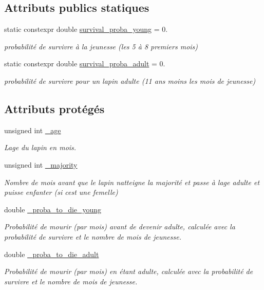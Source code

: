 \subsection*{Attributs publics statiques}
\begin{DoxyCompactItemize}
\item 
static constexpr double \hyperlink{classRabbit_ac6dc736f2b0395fa8692461a457a5297}{survival\+\_\+proba\+\_\+young} = 0.
\begin{DoxyCompactList}\small\item\em probabilité de survivre à la jeunesse (les 5 à 8 premiers mois) \end{DoxyCompactList}\item 
static constexpr double \hyperlink{classRabbit_a8b8affe7fcdc56e08da384d8d82ec556}{survival\+\_\+proba\+\_\+adult} = 0.
\begin{DoxyCompactList}\small\item\em probabilité de survivre pour un lapin adulte (11 ans moins les mois de jeunesse) \end{DoxyCompactList}\end{DoxyCompactItemize}
\subsection*{Attributs protégés}
\begin{DoxyCompactItemize}
\item 
unsigned int \hyperlink{classRabbit_a396c4c8693ea4f827f12afd6d1320ec0}{\+\_\+age}
\begin{DoxyCompactList}\small\item\em L\textquotesingle{}age du lapin en mois. \end{DoxyCompactList}\item 
unsigned int \hyperlink{classRabbit_a7cf441478e82d384166605c69f99f39e}{\+\_\+majority}
\begin{DoxyCompactList}\small\item\em Nombre de mois avant que le lapin n\textquotesingle{}atteigne la majorité et passe à l\textquotesingle{}age adulte et puisse enfanter (si c\textquotesingle{}est une femelle) \end{DoxyCompactList}\item 
double \hyperlink{classRabbit_a622452eedf7ef0addf1e2ce3d8ef34dc}{\+\_\+proba\+\_\+to\+\_\+die\+\_\+young}
\begin{DoxyCompactList}\small\item\em Probabilité de mourir (par mois) avant de devenir adulte, calculée avec la probabilité de survivre et le nombre de mois de jeunesse. \end{DoxyCompactList}\item 
double \hyperlink{classRabbit_a600d8595c407b95965497f7308d72ab1}{\+\_\+proba\+\_\+to\+\_\+die\+\_\+adult}
\begin{DoxyCompactList}\small\item\em Probabilité de mourir (par mois) en étant adulte, calculée avec la probabilité de survivre et le nombre de mois de jeunesse. \end{DoxyCompactList}\end{DoxyCompactItemize}


